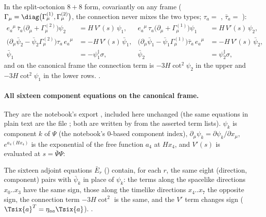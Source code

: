 \noindent In the split-octonion $8+8$ form, covariantly on any frame
($\Gamma_\mu=\diag\bigl(\Gamma^{(1)}_\mu,\Gamma^{(2)}_\mu\bigr)$, the connection never mixes the two types;
$\tau_a=$ , $\bar\tau_a=$ ):
\begin{align*}
  e_a{}^\mu\,\bar\tau_a\bigl(\partial_\mu+\Gamma^{(2)}_\mu\bigr)\psi_2&=H\,V'(s)\,\psi_1, &
  e_a{}^\mu\,\tau_a\bigl(\partial_\mu+\Gamma^{(1)}_\mu\bigr)\psi_1&=H\,V'(s)\,\psi_2,\\
  \bigl(\partial_\mu\bar\psi_2-\bar\psi_2\Gamma^{(2)}_\mu\bigr)\tau_a\,e_a{}^\mu&=-H\,V'(s)\,\bar\psi_1, &
  \bigl(\partial_\mu\bar\psi_1-\bar\psi_1\Gamma^{(1)}_\mu\bigr)\bar\tau_a\,e_a{}^\mu&=-H\,V'(s)\,\bar\psi_2,\\
  \bar\psi_1&=-\psi_1^{\ddagger}\sigma, & \bar\psi_2&=\psi_2^{\ddagger}\sigma ,
\end{align*}
and on the canonical frame the connection term is $-3H\cot^2\psi_2$ in the upper and $-3H\cot^2\psi_1$ in
the lower rows.  .

\paragraph{All sixteen component equations on the canonical frame.} They are the notebook's export
, included here unchanged (the same
equations in plain text are the file ;
both are written by  from the asserted term lists).
$\psi_k$ is component $k$ of $\Psi$ (the notebook's 0-based component index),
$\partial_\mu\psi_k=\partial\psi_k/\partial x_\mu$, $e^{a_4(Hx_4)}$ is the exponential of the free
function $a_4$ at $Hx_4$, and $V'(s)$ is evaluated at $s=\bar\Psi\Psi$:

{\small

}

The sixteen adjoint equations $\bar E_r$ ()
contain, for each $r$, the same eight (direction, component) pairs with $\bar\psi_k$ in place of
$\psi_k$: the terms along the spacelike directions $x_0..x_3$ have the same sign, those along the
timelike directions $x_4..x_7$ the opposite sign, the connection term $-3H\cot^2$ is the same, and the
$V'$ term changes sign ($\Tsix{a}^{T}=\eta_{aa}\Tsix{a}$). 
.

